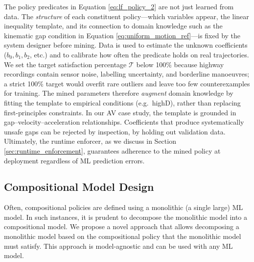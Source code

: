 The policy predicates in Equation \ref{eq:lf_policy_2} are not just learned from data. The \emph{structure} of each constituent policy---which variables appear, the linear inequality template, and its connection to domain knowledge such as the kinematic gap condition in Equation \ref{eq:uniform_motion_ref}---is fixed by the system designer before mining. Data is used to estimate the unknown coefficients ($b_0, b_1, b_2$, etc.) and to calibrate how often the predicate holds on real trajectories. We set the target satisfaction percentage $\mathcal{T}$ below 100\% because highway recordings contain sensor noise, labelling uncertainty, and borderline manoeuvres; a strict 100\% target would overfit rare outliers and leave too few counterexamples for training. The mined parameters therefore \emph{augment} domain knowledge by fitting the template to empirical conditions (e.g.\ highD), rather than replacing first-principles constraints. In our AV case study, the template is grounded in gap--velocity--acceleration relationships. Coefficients that produce systematically unsafe gaps can be rejected by inspection, by holding out validation data. Ultimately, the runtime enforcer, as we discuss in Section \ref{sec:runtime_enforcement}, guarantees adherence to the mined policy at deployment regardless of ML prediction errors.


\subsection{Compositional Model Design}
\label{sec:model_decomposition}

Often, compositional policies are defined using a monolithic (a single large) ML model. In such instances, it is prudent to decompose the monolithic model into a compositional model. We propose a novel approach that allows decomposing a monolithic model based on the compositional policy that the monolithic model must satisfy. This approach is model-agnostic and can be used with any ML model. 

